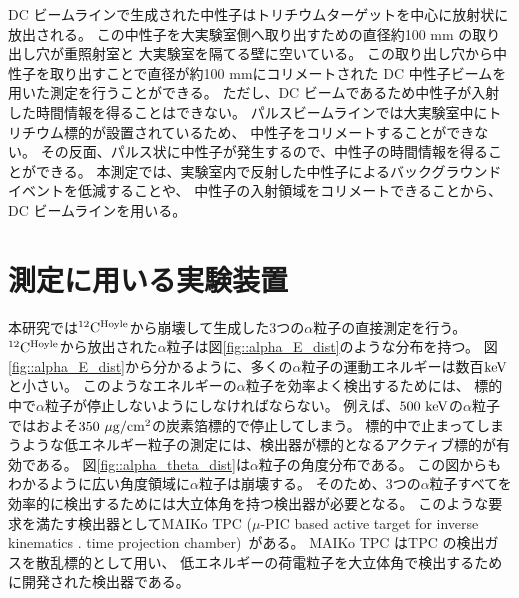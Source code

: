 DC ビームラインで生成された中性子はトリチウムターゲットを中心に放射状に放出される。
この中性子を大実験室側へ取り出すための直径約100 mm の取り出し穴が重照射室と
大実験室を隔てる壁に空いている。
この取り出し穴から中性子を取り出すことで直径が約100 mmにコリメートされた
DC 中性子ビームを用いた測定を行うことができる。
ただし、DC ビームであるため中性子が入射した時間情報を得ることはできない。
パルスビームラインでは大実験室中にトリチウム標的が設置されているため、
中性子をコリメートすることができない。
その反面、パルス状に中性子が発生するので、中性子の時間情報を得ることができる。
本測定では、実験室内で反射した中性子によるバックグラウンドイベントを低減することや、
中性子の入射領域をコリメートできることから、DC ビームラインを用いる。

\section{測定に用いる実験装置}
本研究では${}^{12}{\rm C}^{\rm Hoyle}$から崩壊して生成した3つの$\alpha$粒子の直接測定を行う。
${}^{12}{\rm C}^{\rm Hoyle}$から放出された$\alpha$粒子は図\ref{fig::alpha_E_dist}のような分布を持つ。
図\ref{fig::alpha_E_dist}から分かるように、多くの$\alpha$粒子の運動エネルギーは数百${\rm keV}$と小さい。
このようなエネルギーの$\alpha$粒子を効率よく検出するためには、
標的中で$\alpha$粒子が停止しないようにしなければならない。
例えば、$500~{\rm keV}$の$\alpha$粒子ではおよそ$350~{\rm \mu g/cm^2}$の炭素箔標的で停止してしまう。
標的中で止まってしまうような低エネルギー粒子の測定には、検出器が標的となるアクティブ標的が有効である。
図\ref{fig::alpha_theta_dist}は$\alpha$粒子の角度分布である。
この図からもわかるように広い角度領域に$\alpha$粒子は崩壊する。
そのため、3つの$\alpha$粒子すべてを効率的に検出するためには大立体角を持つ検出器が必要となる。
このような要求を満たす検出器としてMAIKo TPC ($\mu$-PIC based active target for inverse kinematics .
time projection chamber)~\cite{maiko, mupic}がある。
MAIKo TPC はTPC の検出ガスを散乱標的として用い、
低エネルギーの荷電粒子を大立体角で検出するために開発された検出器である。
